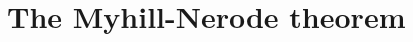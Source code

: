 

\setcounter{section}{4}
\setcounter{subsection}{1}
\setcounter{dfn}{0}

\section{The Myhill-Nerode theorem}

